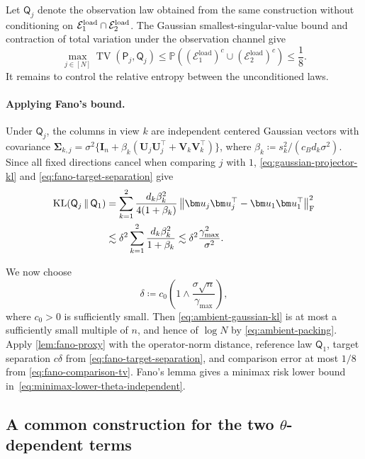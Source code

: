 \documentclass[11pt]{article}
\newcommand{\trans}{\top}
\newcommand{\frn}[1]{\left\lVert #1\right\rVert_{\mathrm{F}}}
\begin{document}
Let $\mathsf Q_j$ denote the observation law obtained from the same
construction without conditioning on $\mathcal E_1^{\rm load}\cap\mathcal E_2^{\rm load}$.
The Gaussian smallest-singular-value bound and contraction of total
variation under the observation channel give
\begin{equation}
\label{eq:fano-comparison-tv}
  \max_{j\in[N]}
  \operatorname{TV}(\mathsf P_j,\mathsf Q_j)
  \le
  \mathbb P\left(
  \left(\mathcal E_1^{\mathrm{load}}\right)^c
  \cup
  \left(\mathcal E_2^{\mathrm{load}}\right)^c
\right)
  \le\frac18.
\end{equation}
It remains to control the relative entropy between the unconditioned laws.


\paragraph{Applying Fano's bound.}
Under $\mathsf Q_j$, the columns in view $k$ are independent centered
Gaussian vectors with covariance
$\bm\Sigma_{k,j}
=\sigma^2\{\bm I_n+\beta_k
(\bm U_j\bm U_j^\trans+\bm V_k\bm V_k^\trans)\}$, where
$\beta_k\coloneqq s_k^2/(c_B d_k\sigma^2)$. Since all fixed directions
cancel when comparing $j$ with $1$, \cref{eq:gaussian-projector-kl} and
\cref{eq:fano-target-separation} give
\begin{align}
  \operatorname{KL}(\mathsf Q_j\,\|\,\mathsf Q_1)
  &=
  \sum_{k=1}^2
  \frac{d_k\beta_k^2}{4(1+\beta_k)}
  \frn{
    \bm u_j\bm u_j^\trans-\bm u_1\bm u_1^\trans
  }^2
  \notag\\
  &\lesssim
  \delta^2
  \sum_{k=1}^2
  \frac{d_k\beta_k^2}{1+\beta_k}
  \lesssim
  \delta^2\frac{\gamma_{\max}^2}{\sigma^2}.
\label{eq:ambient-gaussian-kl}
\end{align}



We now choose
\[
  \delta
  \coloneqq
  c_0\left(
    1\wedge\frac{\sigma\sqrt n}{\gamma_{\max}}
  \right),
\]
where $c_0>0$ is sufficiently small. Then
\cref{eq:ambient-gaussian-kl} is at most a sufficiently small multiple
of $n$, and hence of $\log N$ by
\cref{eq:ambient-packing}.  Apply
\cref{lem:fano-proxy} with the operator-norm distance, reference law
$\mathsf Q_1$, target separation $c\delta$ from
\cref{eq:fano-target-separation}, and comparison error at most $1/8$ from
\cref{eq:fano-comparison-tv}.  Fano's lemma gives a minimax risk lower
bound in~\cref{eq:minimax-lower-theta-independent}.



\subsection{A common construction for the two $\theta$-dependent terms}
\end{document}
